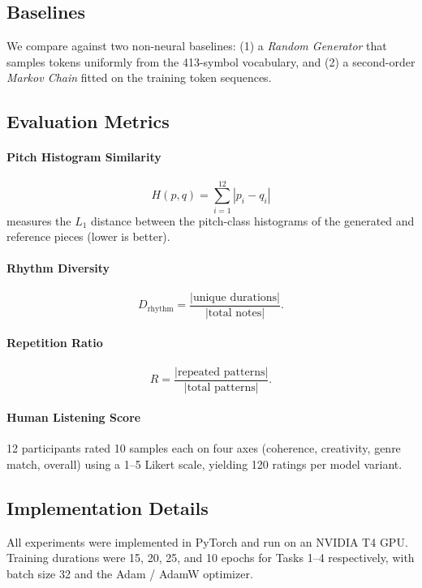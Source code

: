 \documentclass[conference]{IEEEtran}
\begin{document}
\subsection{Baselines}
We compare against two non-neural baselines: (1) a \emph{Random Generator}
that samples tokens uniformly from the 413-symbol vocabulary, and (2) a
second-order \emph{Markov Chain} fitted on the training token sequences.

\subsection{Evaluation Metrics}

\paragraph{Pitch Histogram Similarity}
\begin{equation}
H(p, q) = \sum_{i=1}^{12} |p_i - q_i|
\end{equation}
measures the $L_1$ distance between the pitch-class histograms of the
generated and reference pieces (lower is better).

\paragraph{Rhythm Diversity}
\begin{equation}
D_{\text{rhythm}} = \frac{|\text{unique durations}|}{|\text{total notes}|}.
\end{equation}

\paragraph{Repetition Ratio}
\begin{equation}
R = \frac{|\text{repeated patterns}|}{|\text{total patterns}|}.
\end{equation}

\paragraph{Human Listening Score}
12 participants rated 10 samples each on four axes (coherence, creativity,
genre match, overall) using a 1--5 Likert scale, yielding 120 ratings per
model variant.

\subsection{Implementation Details}
All experiments were implemented in PyTorch and run on an NVIDIA T4 GPU.
Training durations were 15, 20, 25, and 10 epochs for Tasks 1--4
respectively, with batch size 32 and the Adam / AdamW optimizer.
\end{document}

